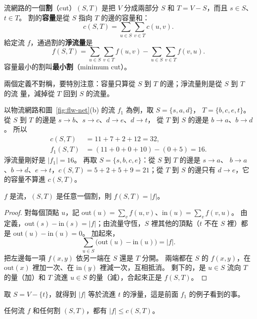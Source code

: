 \begin{definition}[割]
\label{def:flw-cut}
流網路的一個\textbf{割}（cut）$(S, T)$ 是把 $V$ 分成兩部分 $S$ 和 $T = V - S$，而且
$s \in S$、$t \in T$。 割的\textbf{容量}是從 $S$ 指向 $T$ 的邊的容量和：
\[
c(S, T) = \sum_{u \in S} \sum_{v \in T} c(u, v) .
\]
給定流 $f$，通過割的\textbf{淨流量}是
\[
f(S, T) = \sum_{u \in S} \sum_{v \in T} f(u, v) - \sum_{u \in S} \sum_{v \in T} f(v, u) .
\]
容量最小的割叫\textbf{最小割}（minimum cut）。
\end{definition}

兩個定義不對稱，要特別注意：容量只算從 $S$ 到 $T$ 的邊；淨流量則是從 $S$ 到 $T$ 的流
量，減掉從 $T$ 回到 $S$ 的流量。

以物流網路和圖~\ref{fig:flw-net}(b) 的流 $f_1$ 為例，取 $S = \{s, a, d\}$，
$T = \{b, c, e, t\}$。 從 $S$ 到 $T$ 的邊是 $s \to b$、$s \to c$、$d \to e$、$d \to t$，
從 $T$ 到 $S$ 的邊是 $b \to a$、$b \to d$。 所以
\begin{align*}
c(S, T) &= 11 + 7 + 2 + 12 = 32, \\
f_1(S, T) &= (11 + 0 + 0 + 10) - (0 + 5) = 16 .
\end{align*}
淨流量剛好是 $|f_1| = 16$。 再取 $S = \{s, b, c, e\}$：從 $S$ 到 $T$ 的邊是 $s \to a$、
$b \to a$、$b \to d$、$e \to t$，$c(S, T) = 5 + 2 + 5 + 9 = 21$；從 $T$ 到 $S$ 的邊只有
$d \to e$，它的容量不算進 $c(S, T)$。

\begin{lemma}
\label{lem:flw-cutflow}
$f$ 是流，$(S, T)$ 是任意一個割，則 $f(S, T) = |f|$。
\end{lemma}

\begin{proof}
對每個頂點 $u$，記 $\mathrm{out}(u) = \sum_{v} f(u, v)$、$\mathrm{in}(u) = \sum_{v} f(v, u)$。
由定義，$\mathrm{out}(s) - \mathrm{in}(s) = |f|$；由流量守恆，$S$ 裡其他的頂點（$t$ 不在
$S$ 裡）都是 $\mathrm{out}(u) - \mathrm{in}(u) = 0$。 加起來，
\[
\sum_{u \in S} \bigl(\mathrm{out}(u) - \mathrm{in}(u)\bigr) = |f| .
\]
把左邊每一項 $f(x, y)$ 依另一端在 $S$ 還是 $T$ 分開。 兩端都在 $S$ 的 $f(x, y)$，在
$\mathrm{out}(x)$ 裡加一次、在 $\mathrm{in}(y)$ 裡減一次，互相抵消。 剩下的，是 $u \in S$
流向 $T$ 的量（加）和 $T$ 流進 $u \in S$ 的量（減），合起來正是 $f(S, T)$。
\end{proof}

取 $S = V - \{t\}$，就得到 $|f|$ 等於流進 $t$ 的淨量，這是前面 $f_1$ 的例子看到的事。

\begin{corollary}
\label{cor:flw-weak}
任何流 $f$ 和任何割 $(S, T)$，都有 $|f| \le c(S, T)$。
\end{corollary}


